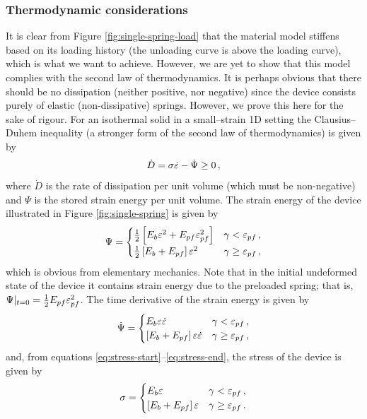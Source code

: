 \documentclass{article}
\begin{document}
\subsubsection{Thermodynamic considerations}
It is clear from Figure \ref{fig:single-spring-load} that the material model stiffens based on its loading history (the unloading curve is above the loading curve), which is what we want to achieve. However, we are yet to show that this model complies with the second law of thermodynamics. It is perhaps obvious that there should be no dissipation (neither positive, nor negative) since the device consists purely of elastic (non-dissipative) springs. However, we prove this here for the sake of rigour. For an isothermal solid in a small--strain 1D setting the Clausius--Duhem inequality (a stronger form of the second law of thermodynamics) is given by
\begin{equation}
	\dot{D} = \sigma \dot{\varepsilon} - \dot{\Psi} \geq 0\,,
\end{equation}
where $\dot{D}$ is the rate of dissipation per unit volume (which must be non-negative) and $\Psi$ is the stored strain energy per unit volume. The strain energy of the device illustrated in Figure \ref{fig:single-spring} is given by
\begin{equation}
	\Psi = \begin{cases}
		\tfrac{1}{2}\left[E_{b}\varepsilon^{2} + E_{pf}\varepsilon_{pf}^{2}\right] & \gamma < \varepsilon_{pf}\,,\\
		\tfrac{1}{2}\left[E_{b} + E_{pf}\right]\varepsilon^{2} & \gamma \geq \varepsilon_{pf}\,,
	\end{cases}
\end{equation}
which is obvious from elementary mechanics. Note that in the initial undeformed state of the device it contains strain energy due to the preloaded spring; that is, $\Psi|_{t=0}=\tfrac{1}{2}E_{pf}\varepsilon_{pf}^{2}$. The time derivative of the strain energy is given by
\begin{equation}
	\dot{\Psi} = \begin{cases}
		E_{b}\varepsilon \dot{\varepsilon}   & \gamma < \varepsilon_{pf}\,,\\
		\left[E_{b} + E_{pf}\right]\varepsilon \dot{\varepsilon} & \gamma \geq \varepsilon_{pf}\,,
	\end{cases}
\end{equation}
and, from equations \eqref{eq:stress-start}--\eqref{eq:stress-end}, the stress of the device is given by 
\begin{equation}
	\sigma = \begin{cases}
		E_{b}\varepsilon    & \gamma < \varepsilon_{pf}\,,\\
		\left[E_{b} + E_{pf}\right]\varepsilon  & \gamma \geq \varepsilon_{pf}\,.
	\end{cases}
\end{equation}
\end{document}
